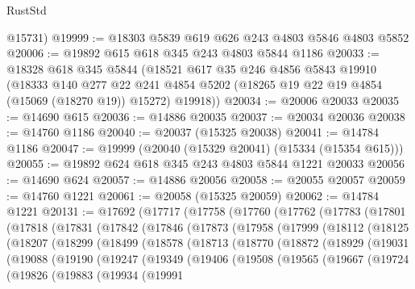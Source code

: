 \begin{lexlean}{RustStd}
\begin{coremodule}
      @15731)
@19999 := @18303 @5839 @619 @626 @243 @4803 @5846 @4803 @5852
@20006 := @19892 @615 @618 @345 @243 @4803 @5844 @1186
@20033 := @18328
    @618
    @345
    @5844
    (@18521
      @617
      @35
      @246
      @4856
      @5843
      @19910
      (@18333
        @140
        @277
        @22
        @241
        @4854
        @5202
        (@18265 @19 @22 @19 @4854 (@15069 (@18270 @19)) @15272)
        @19918))
@20034 := @20006 @20033
@20035 := @14690 @615
@20036 := @14886 @20035
@20037 := @20034 @20036
@20038 := @14760 @1186
@20040 := @20037 (@15325 @20038)
@20041 := @14784 @1186
@20047 := @19999 (@20040 (@15329 @20041) (@15334 (@15354 @615)))
@20055 := @19892 @624 @618 @345 @243 @4803 @5844 @1221 @20033
@20056 := @14690 @624
@20057 := @14886 @20056
@20058 := @20055 @20057
@20059 := @14760 @1221
@20061 := @20058 (@15325 @20059)
@20062 := @14784 @1221
@20131 := @17692
    (@17717
      (@17758
        (@17760
          (@17762
            (@17783
              (@17801
                (@17818
                  (@17831
                    (@17842
                      (@17846
                        (@17873
                          (@17958
                            (@17999
                              (@18112
                                (@18125
                                  (@18207
                                    (@18299
                                      (@18499
                                        (@18578
                                          (@18713
                                            (@18770
                                              (@18872
                                                (@18929
                                                  (@19031
                                                    (@19088
                                                      (@19190
                                                        (@19247
                                                          (@19349
                                                            (@19406
                                                              (@19508
                                                                (@19565
                                                                  (@19667
                                                                    (@19724
                                                                      (@19826
                                                                        (@19883
                                                                          (@19934
                                                                            (@19991

\end{coremodule}
\end{lexlean}
